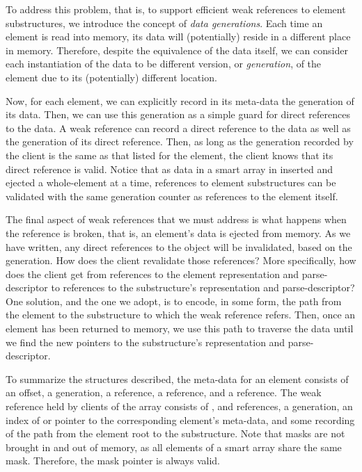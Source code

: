 \documentclass{article}
\begin{document}
To address this problem, that is, to support efficient weak references
to element substructures, we introduce the concept of {\em data
  generations}. Each time an element is read into memory, its data
will (potentially) reside in a different place in memory. Therefore,
despite the equivalence of the data itself, we can consider each
instantiation of the data to be different version, or {\em
  generation}, of the element due to its (potentially) different
location. 

Now, for each element, we can explicitly record in its meta-data the
generation of its data. Then, we can use this generation as a simple
guard for direct references to the data.  A weak reference can record
a direct reference to the data as well as the generation of its direct
reference. Then, as long as the generation recorded by the client is
the same as that listed for the element, the client knows that its
direct reference is valid. Notice that as data in a smart array in
inserted and ejected a whole-element at a time, references to element
substructures can be validated with the same generation counter as
references to the element itself.

The final aspect of weak references that we must address is what
happens when the reference is broken, that is, an element's data is
ejected from memory. As we have written, any direct references to the
object will be invalidated, based on the generation. How does the
client revalidate those references? More specifically, how does the
client get from references to the element representation and
parse-descriptor to references to the substructure's representation
and parse-descriptor? One solution, and the one we adopt, is to
encode, in some form, the path from the element to the substructure to
which the weak reference refers. Then, once an element has been
returned to memory, we use this path to traverse the data until we
find the new pointers to the substructure's representation and
parse-descriptor.

To summarize the structures described, the meta-data for an element
consists of an offset, a generation, a \mask reference, a \rep
reference, and a \pd reference.  The weak reference held by clients of
the array consists of \mask, \rep and \pd references, a generation, an
index of or pointer to the corresponding element's meta-data, and some
recording of the path from the element root to the substructure. Note
that masks are not brought in and out of memory, as all elements of a
smart array share the same mask. Therefore, the mask pointer is always
valid.
\end{document}
